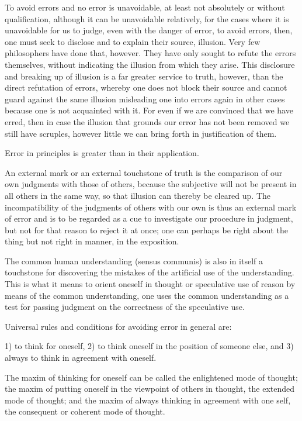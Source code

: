     To avoid errors and no error is unavoidable,
    at least not absolutely or without qualification,
    although it can be unavoidable relatively,
    for the cases where it is unavoidable for us to judge,
    even with the danger of error,
    to avoid errors, then, one must seek to
    disclose and to explain their source, illusion.
    Very few philosophers have done that, however.
    They have only sought to refute the errors themselves,
    without indicating the illusion from which they arise.
    This disclosure and breaking up of illusion is
    a far greater service to truth, however, than the direct refutation
    of errors, whereby one does not block their source and cannot guard
    against the same illusion misleading one into errors again in other cases
    because one is not acquainted with it.
    For even if we are convinced that we have erred,
    then in case the illusion that grounds our error
    has not been removed we still have scruples,
    however little we can bring forth in justification of them.

Error in principles is greater than in their application.

An external mark or an external touchstone of truth is
the comparison of our own judgments with those of others,
because the subjective will not be present in all others in the same way,
so that illusion can thereby be cleared up.
The incompatibility of the judgments of others with our own is
thus an external mark of error and is to be regarded as a cue to investigate
our procedure in judgment, but not for that reason to reject it at once;
one can perhaps be right about the thing but not right in manner,
in the exposition.

The common human understanding (sensus communis) is also in itself
a touchstone for discovering the mistakes of the artificial use
of the understanding.
This is what it means to orient oneself in thought or
speculative use of reason by means of the common understanding,
one uses the common understanding as a test for passing judgment
on the correctness of the speculative use.

Universal rules and conditions for avoiding error in general are:

1) to think for oneself,
2) to think oneself in the position of someone else, and
3) always to think in agreement with oneself.

The maxim of thinking for oneself can be called
the enlightened mode of thought;
the maxim of putting oneself in the viewpoint of others in thought,
the extended mode of thought;
and the maxim of always thinking in agreement with one self,
the consequent or coherent mode of thought.

